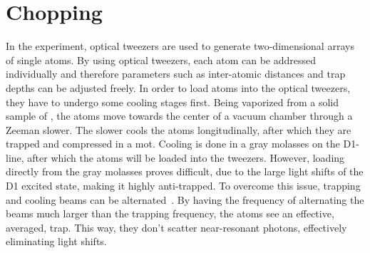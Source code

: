 \chapter{Chopping}%
\label{ch:chopping}


In the experiment, optical tweezers are used to generate two-dimensional arrays of single atoms. By using optical tweezers, each atom can be addressed individually and therefore parameters such as inter-atomic distances and trap depths can be adjusted freely. In order to load atoms into the optical tweezers, they have to undergo some cooling stages first. Being vaporized from a solid sample of , the atoms move towards the center of a vacuum chamber through a Zeeman slower. The slower cools the atoms longitudinally, after which they are trapped and compressed in a \ac{mot}. Cooling is done in a gray molasses on the D1-line, after which the atoms will be loaded into the tweezers. However, loading directly from the gray molasses proves difficult, due to the large light shifts of the D1 excited state, making it highly anti-trapped. To overcome this issue, trapping and cooling beams can be alternated~\cite{Hutzler2017}. By having the frequency of alternating the beams much larger than the trapping frequency, the atoms see an effective, averaged, trap. This way, they don't scatter near-resonant photons, effectively eliminating light shifts.


